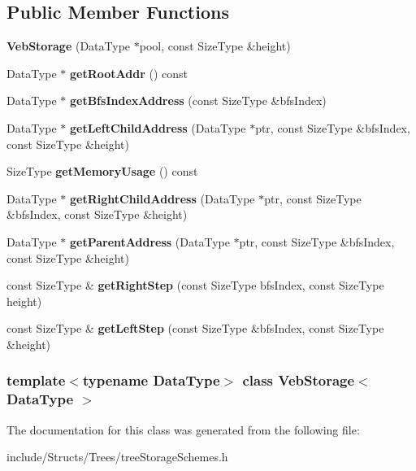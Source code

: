 \subsection*{Public Member Functions}
\begin{DoxyCompactItemize}
\item 
\hypertarget{class_veb_storage_a458ac0413b0a17213910705c5b61a940}{
{\bfseries VebStorage} (DataType $\ast$pool, const SizeType \&height)}
\label{class_veb_storage_a458ac0413b0a17213910705c5b61a940}

\item 
\hypertarget{class_veb_storage_a26f8e08ba94f2c4df5c66a7124cea647}{
DataType $\ast$ {\bfseries getRootAddr} () const }
\label{class_veb_storage_a26f8e08ba94f2c4df5c66a7124cea647}

\item 
\hypertarget{class_veb_storage_a402ded1716e7a481c0e216c9c6d07ec8}{
DataType $\ast$ {\bfseries getBfsIndexAddress} (const SizeType \&bfsIndex)}
\label{class_veb_storage_a402ded1716e7a481c0e216c9c6d07ec8}

\item 
\hypertarget{class_veb_storage_a2dcabb6b6922b5db8cc8ee1c7c41ecd0}{
DataType $\ast$ {\bfseries getLeftChildAddress} (DataType $\ast$ptr, const SizeType \&bfsIndex, const SizeType \&height)}
\label{class_veb_storage_a2dcabb6b6922b5db8cc8ee1c7c41ecd0}

\item 
\hypertarget{class_veb_storage_a15bb5536c18540cb630cd2efdac833f3}{
SizeType {\bfseries getMemoryUsage} () const }
\label{class_veb_storage_a15bb5536c18540cb630cd2efdac833f3}

\item 
\hypertarget{class_veb_storage_ac2f847b4309d98a22f6d0a7316f1117b}{
DataType $\ast$ {\bfseries getRightChildAddress} (DataType $\ast$ptr, const SizeType \&bfsIndex, const SizeType \&height)}
\label{class_veb_storage_ac2f847b4309d98a22f6d0a7316f1117b}

\item 
\hypertarget{class_veb_storage_a5dedc755305e9dd5ce8ca5d1fdb60ffd}{
DataType $\ast$ {\bfseries getParentAddress} (DataType $\ast$ptr, const SizeType \&bfsIndex, const SizeType \&height)}
\label{class_veb_storage_a5dedc755305e9dd5ce8ca5d1fdb60ffd}

\item 
\hypertarget{class_veb_storage_a300cc2398c5bd64cadef1c980f55ee70}{
const SizeType \& {\bfseries getRightStep} (const SizeType bfsIndex, const SizeType height)}
\label{class_veb_storage_a300cc2398c5bd64cadef1c980f55ee70}

\item 
\hypertarget{class_veb_storage_ac00abf35d63fbe4d79e2291503b11293}{
const SizeType \& {\bfseries getLeftStep} (const SizeType \&bfsIndex, const SizeType \&height)}
\label{class_veb_storage_ac00abf35d63fbe4d79e2291503b11293}

\end{DoxyCompactItemize}
\subsubsection*{template$<$typename DataType$>$ class VebStorage$<$ DataType $>$}



The documentation for this class was generated from the following file:\begin{DoxyCompactItemize}
\item 
include/Structs/Trees/treeStorageSchemes.h\end{DoxyCompactItemize}
